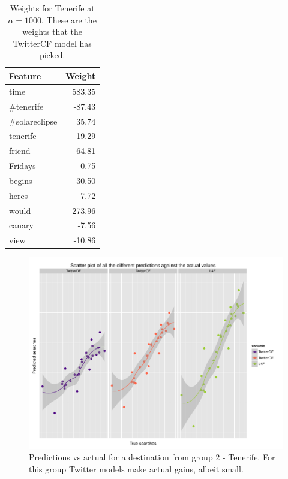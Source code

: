\documentclass[minf,twoside,singlespacing,parskip,frontabs]{infthesis}
\begin{document}
\begin{table}[]
\begin{center}
\begin{tabular}{l | r}
Feature & Weight \\
\hline
time & 583.35 \\
\#tenerife & -87.43 \\
\#solareclipse & 35.74\\
tenerife & -19.29\\
friend & 64.81\\
Fridays & 0.75\\
begins & -30.50\\
heres & 7.72\\
would & -273.96\\
canary & -7.56\\
view & -10.86 \\
\end{tabular}
\end{center}
\caption{Weights for Tenerife at $\alpha=1000$. These are the weights that the TwitterCF model has picked.}
\end{table}




\begin{figure}[]
\begin{center}
\includegraphics[scale=0.4]{plots/Tenerife}
\end{center}
\caption{Predictions vs actual for a destination from group 2 - Tenerife. For this group Twitter models make actual gains, albeit small.}
\end{figure}
\end{document}
